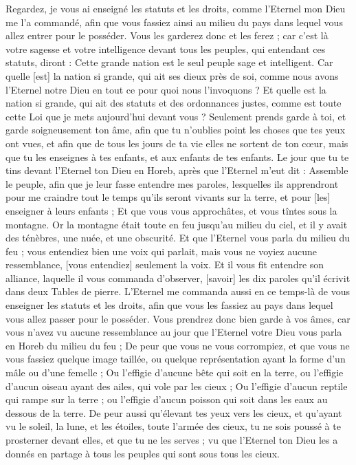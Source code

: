 \begin{multicols}{2}
Regardez, je vous ai enseigné les statuts et les droits, comme l'Eternel mon Dieu me l'a commandé, afin que vous fassiez ainsi au milieu du pays dans lequel vous allez entrer pour le posséder.
Vous les garderez donc et les ferez ; car c'est là votre sagesse et votre intelligence devant tous les peuples, qui entendant ces statuts, diront : Cette grande nation est le seul peuple sage et intelligent.
Car quelle [est] la nation si grande, qui ait ses dieux près de soi, comme nous avons l'Eternel notre Dieu en tout ce pour quoi nous l'invoquons ?
Et quelle est la nation si grande, qui ait des statuts et des ordonnances justes, comme est toute cette Loi que je mets aujourd'hui devant vous ?
Seulement prends garde à toi, et garde soigneusement ton âme, afin que tu n'oublies point les choses que tes yeux ont vues, et afin que de tous les jours de ta vie elles ne sortent de ton cœur, mais que tu les enseignes à tes enfants, et aux enfants de tes enfants.
Le jour que tu te tins devant l'Eternel ton Dieu en Horeb, après que l'Eternel m'eut dit : Assemble le peuple, afin que je leur fasse entendre mes paroles, lesquelles ils apprendront pour me craindre tout le temps qu'ils seront vivants sur la terre, et pour [les] enseigner à leurs enfants ;
Et que vous vous approchâtes, et vous tîntes sous la montagne. Or la montagne était toute en feu jusqu'au milieu du ciel, et il y avait des ténèbres, une nuée, et une obscurité.
Et que l'Eternel vous parla du milieu du feu ; vous entendiez bien une voix qui parlait, mais vous ne voyiez aucune ressemblance, [vous entendiez] seulement la voix.
Et il vous fit entendre son alliance, laquelle il vous commanda d'observer, [savoir] les dix paroles qu'il écrivit dans deux Tables de pierre.
L'Eternel me commanda aussi en ce temps-là de vous enseigner les statuts et les droits, afin que vous les fassiez au pays dans lequel vous allez passer pour le posséder.
Vous prendrez donc bien garde à vos âmes, car vous n'avez vu aucune ressemblance au jour que l'Eternel votre Dieu vous parla en Horeb du milieu du feu ;
De peur que vous ne vous corrompiez, et que vous ne vous fassiez quelque image taillée, ou quelque représentation ayant la forme d'un mâle ou d'une femelle ;
Ou l'effigie d'aucune bête qui soit en la terre, ou l'effigie d'aucun oiseau ayant des ailes, qui vole par les cieux ;
Ou l'effigie d'aucun reptile qui rampe sur la terre ; ou l'effigie d'aucun poisson qui soit dans les eaux au dessous de la terre.
De peur aussi qu'élevant tes yeux vers les cieux, et qu'ayant vu le soleil, la lune, et les étoiles, toute l'armée des cieux, tu ne sois poussé à te prosterner devant elles, et que tu ne les serves ; vu que l'Eternel ton Dieu les a donnés en partage à tous les peuples qui sont sous tous les cieux.

\end{multicols}
